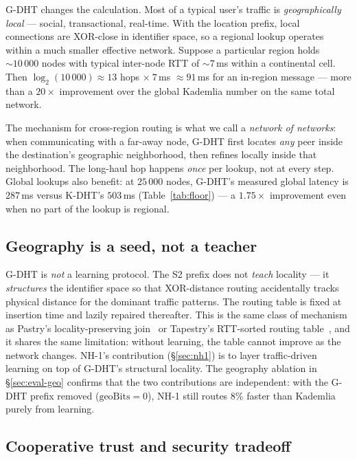 \documentclass[conference]{IEEEtran}
\newcommand{\nhone}{NH-1\xspace}
\newcommand{\GDHT}{G-DHT\xspace}
\begin{document}
\GDHT changes the calculation. Most of a typical user's traffic is
\emph{geographically local} --- social, transactional, real-time. With
the location prefix, local connections are XOR-close in identifier
space, so a regional lookup operates within a much smaller effective
network. Suppose a particular region holds $\sim\!10\,000$ nodes with
typical inter-node RTT of $\sim\!7$\,ms within a continental cell.
Then $\log_2(10\,000) \approx 13$ hops $\times\ 7$\,ms $\approx
91$\,ms for an in-region message --- more than a $20\times$ improvement
over the global Kademlia number on the same total network.

The mechanism for cross-region routing is what we call a
\emph{network of networks}: when communicating with a far-away node,
\GDHT first locates \emph{any} peer inside the destination's
geographic neighborhood, then refines locally inside that
neighborhood. The long-haul hop happens \emph{once} per lookup, not
at every step. Global lookups also benefit: at $25\,000$ nodes,
\GDHT's measured global latency is $287$\,ms versus K-DHT's
$503$\,ms (Table~\ref{tab:floor}) --- a $1.75\times$ improvement
even when no part of the lookup is regional.

\subsection{Geography is a seed, not a teacher}
\label{sec:gdht-seed}

\GDHT is \emph{not} a learning protocol. The S2 prefix does not
\emph{teach} locality --- it \emph{structures} the identifier space so
that XOR-distance routing accidentally tracks physical distance for
the dominant traffic patterns. The routing table is fixed at
insertion time and lazily repaired thereafter. This is the same
class of mechanism as Pastry's locality-preserving
join~\cite{rowstron2001pastry} or Tapestry's RTT-sorted routing
table~\cite{zhao2004tapestry}, and it shares the same limitation:
without learning, the table cannot improve as the network changes.
\nhone's contribution (\S\ref{sec:nh1}) is to layer
traffic-driven learning on top of \GDHT's structural locality.
The geography ablation in \S\ref{sec:eval-geo} confirms that the
two contributions are independent: with the \GDHT prefix removed
($\mathrm{geoBits} = 0$), \nhone still routes $8\%$ faster than
Kademlia purely from learning.

\subsection{Cooperative trust and security tradeoff}
\label{sec:gdht-trust}
\end{document}
